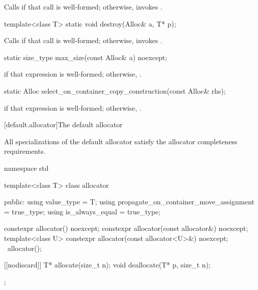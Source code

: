 \begin{itemdescr}
\pnum
\effects Calls 
if that call is well-formed;
otherwise, invokes .
\end{itemdescr}

%
\begin{itemdecl}
template<class T>
  static void destroy(Alloc& a, T* p);
\end{itemdecl}

\begin{itemdescr}
\pnum
\effects Calls  if that call is well-formed; otherwise, invokes
.
\end{itemdescr}

%
\begin{itemdecl}
static size_type max_size(const Alloc& a) noexcept;
\end{itemdecl}

\begin{itemdescr}
\pnum
\returns {} if that expression is well-formed; otherwise,
.
\end{itemdescr}

%
\begin{itemdecl}
static Alloc select_on_container_copy_construction(const Alloc& rhs);
\end{itemdecl}

\begin{itemdescr}
\pnum
\returns {} if that expression is
well-formed; otherwise, .
\end{itemdescr}

[default.allocator]{The default allocator}

\pnum
All specializations of the default allocator satisfy the
allocator completeness requirements.

%
%
%
%
\begin{codeblock}
namespace std {
  template<class T> class allocator {
   public:
    using value_type      = T;
    using propagate_on_container_move_assignment = true_type;
    using is_always_equal = true_type;

    constexpr allocator() noexcept;
    constexpr allocator(const allocator&) noexcept;
    template<class U> constexpr allocator(const allocator<U>&) noexcept;
    ~allocator();

    [[nodiscard]] T* allocate(size_t n);
    void deallocate(T* p, size_t n);
  };
}
\end{codeblock}

